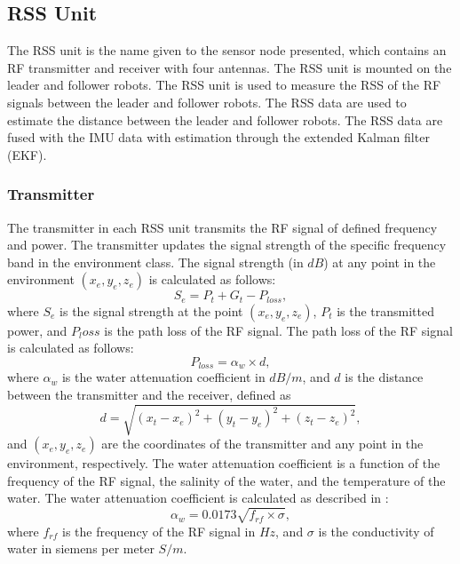 \documentclass{ifacconf}
\begin{document}
\subsection{RSS Unit}
The RSS unit is the name given to the sensor node presented, which contains an RF transmitter and receiver with four antennas. The RSS unit is mounted on the leader and follower robots. The RSS unit is used to measure the RSS of the RF signals between the leader and follower robots. The RSS data are used to estimate the distance between the leader and follower robots. The RSS data are fused with the IMU data with estimation through the extended Kalman filter (EKF).

\subsubsection{Transmitter}
The transmitter in each RSS unit transmits the RF signal of defined frequency and power. The transmitter updates the signal strength of the specific frequency band in the environment class. The signal strength (in $dB$) at any point in the environment $(x_e, y_e, z_e)$ is calculated as follows:
\begin{equation}
    S_e = P_t + G_t - P_{loss},
\end{equation}
where $S_e$ is the signal strength at the point $(x_e, y_e, z_e)$, $P_t$ is the transmitted power, and $P_loss$ is the path loss of the RF signal. The path loss of the RF signal is calculated as follows:
\begin{equation}
    P_{loss} = \alpha_w \times d,
\end{equation}
where $\alpha_w$ is the water attenuation coefficient in $dB/m$, and $d$ is the distance between the transmitter and the receiver, defined as
\begin{equation}
    d = \sqrt{(x_t - x_e)^2 + (y_t - y_e)^2 + (z_t - z_e)^2},
\end{equation}
and $(x_e, y_e, z_e)$ are the coordinates of the transmitter and any point in the environment, respectively. The water attenuation coefficient is a function of the frequency of the RF signal, the salinity of the water, and the temperature of the water. The water attenuation coefficient is calculated as described in \cite{vk5br1987}:
\begin{equation}
    \alpha_w = 0.0173 \sqrt{f_{rf} \times \sigma},
\end{equation}
where $f_{rf}$ is the frequency of the RF signal in $Hz$, and $\sigma$ is the conductivity of water in siemens per meter $S/m$. 
\end{document}
